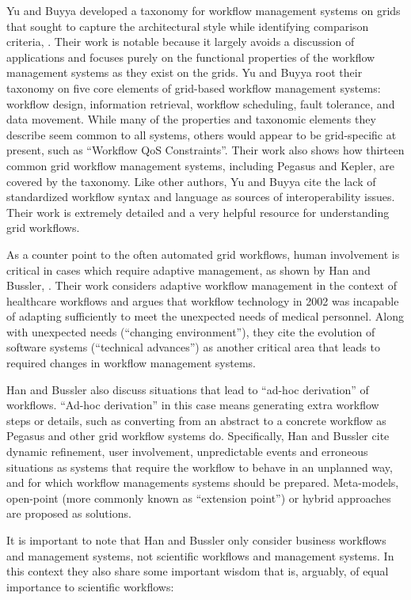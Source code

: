 Yu and Buyya developed a taxonomy for workflow management systems on
grids that sought to capture the architectural style while identifying
comparison criteria, \cite{yu_taxonomy_2005}. Their work is notable because it
largely avoids a discussion of applications and focuses purely on the
functional properties of the workflow management systems as they exist
on the grids. Yu and Buyya root their taxonomy on five core elements of
grid-based workflow management systems: workflow design, information
retrieval, workflow scheduling, fault tolerance, and data movement.
While many of the properties and taxonomic elements they describe seem
common to all systems, others would appear to be grid-specific at present, such
as ``Workflow QoS Constraints''. Their work also shows how thirteen common grid
workflow management systems, including Pegasus and Kepler, are covered by the
taxonomy. Like other authors, Yu and Buyya cite the lack of standardized
workflow syntax and language as sources of interoperability issues. Their work is extremely
detailed and a very helpful resource for understanding grid workflows.

As a counter point to the often automated grid workflows, human involvement is 
critical in cases which require adaptive
management, as shown by Han and Bussler, \cite{han_taxonomy_1998}. Their work
considers adaptive workflow management in the context of healthcare
workflows and argues that workflow technology in 2002 was incapable of
adapting sufficiently to meet the unexpected needs of medical personnel.
Along with unexpected needs (``changing environment''), they cite the
evolution of software systems (``technical advances'') as another
critical area that leads to required changes in workflow management
systems.

Han and Bussler also discuss situations that lead to ``ad-hoc derivation'' of
workflows. ``Ad-hoc derivation'' in this case means generating extra
workflow steps or details, such as converting from an abstract to a
concrete workflow as Pegasus and other grid workflow systems do.
Specifically, Han and Bussler cite dynamic refinement, user involvement,
unpredictable events and erroneous situations as systems that require
the workflow to behave in an unplanned way, and for which
workflow managements systems should be prepared. Meta-models, open-point
(more commonly known as ``extension point'') or hybrid approaches are
proposed as solutions.

It is important to note that Han and Bussler only consider business
workflows and management systems, not scientific workflows and
management systems. In this context they also share some important
wisdom that is, arguably, of equal importance to scientific workflows:

